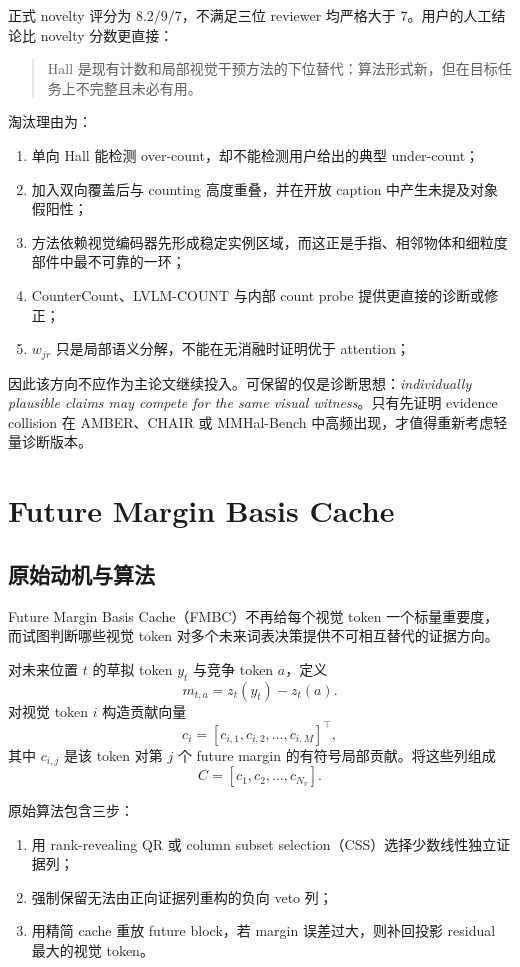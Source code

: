 \documentclass[UTF8,zihao=-4,a4paper]{ctexart}
\begin{document}
正式 novelty 评分为 $8.2/9/7$，不满足三位 reviewer 均严格大于 7。用户的人工结论比 novelty 分数更直接：

\begin{quote}
Hall 是现有计数和局部视觉干预方法的下位替代：算法形式新，但在目标任务上不完整且未必有用。
\end{quote}

淘汰理由为：

\begin{enumerate}
  \item 单向 Hall 能检测 over-count，却不能检测用户给出的典型 under-count；
  \item 加入双向覆盖后与 counting 高度重叠，并在开放 caption 中产生未提及对象假阳性；
  \item 方法依赖视觉编码器先形成稳定实例区域，而这正是手指、相邻物体和细粒度部件中最不可靠的一环；
  \item CounterCount、LVLM-COUNT 与内部 count probe 提供更直接的诊断或修正；
  \item $w_{jr}$ 只是局部语义分解，不能在无消融时证明优于 attention；
\end{enumerate}

因此该方向不应作为主论文继续投入。可保留的仅是诊断思想：\emph{individually plausible claims may compete for the same visual witness}。只有先证明 evidence collision 在 AMBER、CHAIR 或 MMHal-Bench 中高频出现，才值得重新考虑轻量诊断版本。

\section{Future Margin Basis Cache}
\label{sec:fmbc}

\subsection{原始动机与算法}

Future Margin Basis Cache（FMBC）不再给每个视觉 token 一个标量重要度，而试图判断哪些视觉 token 对多个未来词表决策提供不可相互替代的证据方向。

对未来位置 $t$ 的草拟 token $y_t$ 与竞争 token $a$，定义
\[
m_{t,a}=z_t(y_t)-z_t(a).
\]
对视觉 token $i$ 构造贡献向量
\[
c_i=[c_{i,1},c_{i,2},\ldots,c_{i,M}]^\top,
\]
其中 $c_{i,j}$ 是该 token 对第 $j$ 个 future margin 的有符号局部贡献。将这些列组成
\[
C=[c_1,c_2,\ldots,c_{N_v}].
\]

原始算法包含三步：

\begin{enumerate}
  \item 用 rank-revealing QR 或 column subset selection（CSS）选择少数线性独立证据列；
  \item 强制保留无法由正向证据列重构的负向 veto 列；
  \item 用精简 cache 重放 future block，若 margin 误差过大，则补回投影 residual 最大的视觉 token。
\end{enumerate}
\end{document}
